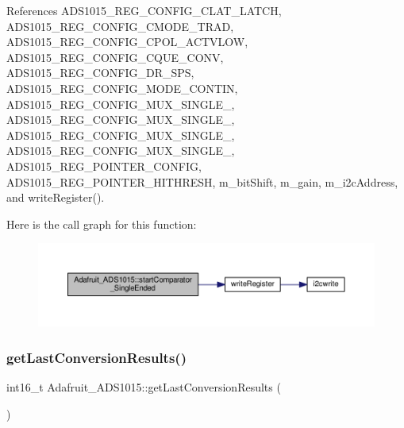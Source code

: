 References A\+D\+S1015\+\_\+\+R\+E\+G\+\_\+\+C\+O\+N\+F\+I\+G\+\_\+\+C\+L\+A\+T\+\_\+\+L\+A\+T\+CH, A\+D\+S1015\+\_\+\+R\+E\+G\+\_\+\+C\+O\+N\+F\+I\+G\+\_\+\+C\+M\+O\+D\+E\+\_\+\+T\+R\+AD, A\+D\+S1015\+\_\+\+R\+E\+G\+\_\+\+C\+O\+N\+F\+I\+G\+\_\+\+C\+P\+O\+L\+\_\+\+A\+C\+T\+V\+L\+OW, A\+D\+S1015\+\_\+\+R\+E\+G\+\_\+\+C\+O\+N\+F\+I\+G\+\_\+\+C\+Q\+U\+E\+\_\+C\+O\+NV, A\+D\+S1015\+\_\+\+R\+E\+G\+\_\+\+C\+O\+N\+F\+I\+G\+\_\+\+D\+R\+\_\+S\+PS, A\+D\+S1015\+\_\+\+R\+E\+G\+\_\+\+C\+O\+N\+F\+I\+G\+\_\+\+M\+O\+D\+E\+\_\+\+C\+O\+N\+T\+IN, A\+D\+S1015\+\_\+\+R\+E\+G\+\_\+\+C\+O\+N\+F\+I\+G\+\_\+\+M\+U\+X\+\_\+\+S\+I\+N\+G\+L\+E\+\_, A\+D\+S1015\+\_\+\+R\+E\+G\+\_\+\+C\+O\+N\+F\+I\+G\+\_\+\+M\+U\+X\+\_\+\+S\+I\+N\+G\+L\+E\+\_, A\+D\+S1015\+\_\+\+R\+E\+G\+\_\+\+C\+O\+N\+F\+I\+G\+\_\+\+M\+U\+X\+\_\+\+S\+I\+N\+G\+L\+E\+\_, A\+D\+S1015\+\_\+\+R\+E\+G\+\_\+\+C\+O\+N\+F\+I\+G\+\_\+\+M\+U\+X\+\_\+\+S\+I\+N\+G\+L\+E\+\_, A\+D\+S1015\+\_\+\+R\+E\+G\+\_\+\+P\+O\+I\+N\+T\+E\+R\+\_\+\+C\+O\+N\+F\+IG, A\+D\+S1015\+\_\+\+R\+E\+G\+\_\+\+P\+O\+I\+N\+T\+E\+R\+\_\+\+H\+I\+T\+H\+R\+E\+SH, m\+\_\+bit\+Shift, m\+\_\+gain, m\+\_\+i2c\+Address, and write\+Register().

Here is the call graph for this function\+:\nopagebreak
\begin{figure}[H]
\begin{center}
\leavevmode
\includegraphics[width=350pt]{df/df6/class_adafruit___a_d_s1015_aecd30775d943ea9d9cff0e3485926596_cgraph}
\end{center}
\end{figure}
\mbox{\label{class_adafruit___a_d_s1015_ad8f36d80847020778425107f6451a8c2}} 
\subsubsection{\texorpdfstring{get\+Last\+Conversion\+Results()}{getLastConversionResults()}}
{\footnotesize\ttfamily int16\+\_\+t Adafruit\+\_\+\+A\+D\+S1015\+::get\+Last\+Conversion\+Results (\begin{DoxyParamCaption}{ }\end{DoxyParamCaption})}



